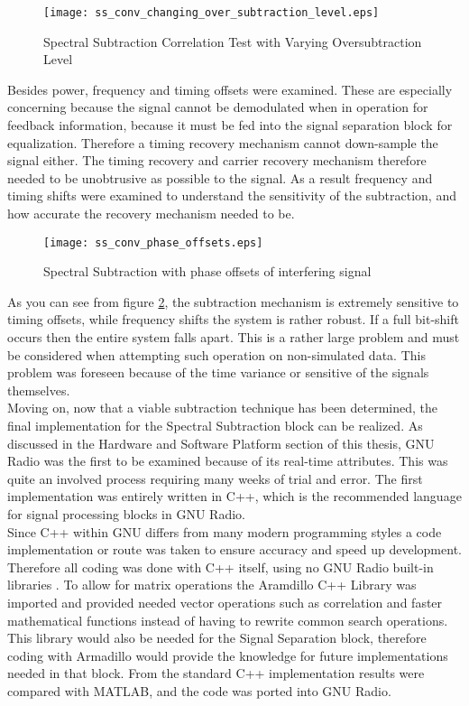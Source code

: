 \begin{figure}[!ht]\label{power_delta}  
\centering
\texttt{[image: ss\_conv\_changing\_over\_subtraction\_level.eps]}
\caption{Spectral Subtraction Correlation Test with Varying Oversubtraction Level}
\end{figure}

Besides power, frequency and timing offsets were examined.  These are especially concerning because the signal cannot be demodulated when in operation for feedback information, because it must be fed into the signal separation block for equalization.  Therefore a timing recovery mechanism cannot down-sample the signal either.  The timing recovery and carrier recovery mechanism therefore needed to be unobtrusive as possible to the signal.  As a result frequency and timing shifts were examined to understand the sensitivity of the subtraction, and how accurate the recovery mechanism needed to be.

\begin{figure}[!ht]\label{shifting}
\centering
\texttt{[image: ss\_conv\_phase\_offsets.eps]}
\caption{Spectral Subtraction with phase offsets of interfering signal}
\end{figure}

As you can see from figure \ref{shifting}, the subtraction mechanism is extremely sensitive to timing offsets, while frequency shifts the system is rather robust.  If a full bit-shift occurs then the entire system falls apart.  This is a rather large problem and must be considered when attempting such operation on non-simulated data.  This problem was foreseen because of the time variance or sensitive of the signals themselves. \\

Moving on, now that a viable subtraction technique has been determined, the final implementation for the Spectral Subtraction block can be realized.  As discussed in the Hardware and Software Platform section of this thesis, GNU Radio was the first to be examined because of its real-time attributes.  This was quite an involved process requiring many weeks of trial and error.  The first implementation was entirely written in C++, which is the recommended language for signal processing blocks in GNU Radio.\\  

Since C++ within GNU differs from many modern programming styles a code implementation or route was taken to ensure accuracy and speed up development.  Therefore all coding was done with C++ itself, using no GNU Radio built-in libraries \cite{gnuradioCPP}.  To allow for matrix operations the Aramdillo C++ Library \cite{armadillo} was imported and provided needed vector operations such as correlation and faster mathematical functions instead of having to rewrite common search operations.  This library would also be needed for the Signal Separation block, therefore coding with Armadillo would provide the knowledge for future implementations needed in that block.  From the standard C++ implementation results were compared with MATLAB, and the code was ported into GNU Radio.\\

